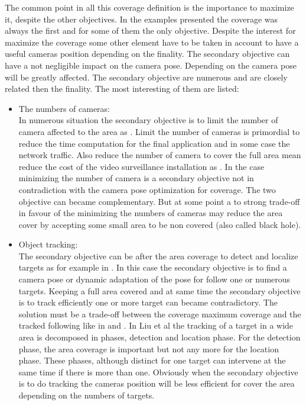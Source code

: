 The common point in all this coverage definition is the importance to maximize it, despite the other objectives. In the examples presented the coverage was always the first and for some of them the only objective. Despite the interest for maximize the coverage some other element have to be taken in account to have a useful cameras position depending on the finality. The secondary objective can have a not negligible impact on the camera pose. Depending on the camera pose will be greatly affected. The secondary objective are numerous and are closely related then the finality. The most interesting of them are listed:\\
\begin{itemize}
\item  The numbers of cameras: \\ In numerous situation the secondary objective is to limit the number of camera affected to the area as \cite{151*zhao2013,171*horster2006,22*zhao2008}. Limit the number of cameras is primordial to reduce the time computation for the final application and in some case the network traffic. Also reduce the number of camera to cover the full area mean reduce the cost of the video surveillance installation as \cite{82*chrysostomou2012}. In the case  minimizing the number of camera is a secondary objective not in contradiction with the camera pose optimization for coverage. The two objective can became complementary. But at some point a to strong trade-off in favour of the minimizing the numbers of cameras may reduce the area cover by accepting some small area  to be non covered (also called black hole). \\

\item Object tracking: \\ The secondary objective can be after the area coverage to detect and localize targets as for example in \cite{18*ding2012,12*soto2009,23*liu2009,39*wu2011,40*sohrabi2000,22*zhao2008}. In this case the secondary objective is to find a camera pose or dynamic adaptation of the pose for follow one or numerous targets. Keeping a full area covered and at same time the secondary objective is to track efficiently one or more target can became contradictory. The solution must be a trade-off between the coverage maximum coverage and the tracked following like in \cite{18*ding2012} and \cite{38*liu2010}. In Liu et al \cite{38*liu2010} the tracking of a target in a wide area is decomposed in phases, detection and location phase. For the detection phase, the area coverage is important but not any more for the location phase. These phases, although distinct for one target can intervene at the same time if there is more than one. Obviously when the secondary objective is to do tracking the cameras position will be less efficient for cover the area depending on the numbers of targets.  \\


\end{itemize}
